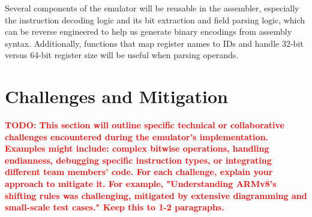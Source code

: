 \documentclass[11pt,a4paper]{article} %
\newcommand{\todo}[1]{\textcolor{red}{\textbf{TODO: #1}}}
\begin{document}
Several components of the emulator will be reusable in the assembler, especially the instruction decoding logic and its bit extraction and field parsing logic, which can be reverse engineered to help us generate binary encodings from assembly syntax. Additionally, functions that map register names to IDs and handle 32-bit versus 64-bit register size will be useful when parsing operands.

\section{Challenges and Mitigation}
\label{sec:challenges}
\todo{This section will outline specific technical or collaborative challenges encountered during the emulator's implementation. Examples might include: complex bitwise operations, handling endianness, debugging specific instruction types, or integrating different team members' code. For each challenge, explain your approach to mitigate it. For example, "Understanding ARMv8's shifting rules was challenging, mitigated by extensive diagramming and small-scale test cases." Keep this to 1-2 paragraphs.}
\end{document}

